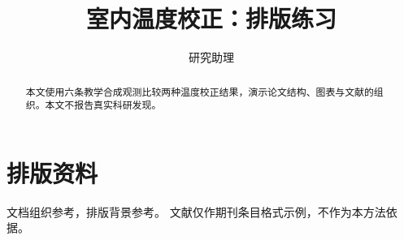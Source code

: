 \documentclass[UTF8,fontset=fandol,a4paper,11pt]{ctexart}
\title{室内温度校正：排版练习}
\author{研究助理}
\date{}
\begin{document}
\maketitle
\begin{abstract}本文使用六条教学合成观测比较两种温度校正结果，演示论文结构、图表与文献的组织。本文不报告真实科研发现。\end{abstract}



\section{排版资料}
文档组织参考\cite{lamport1994}，排版背景参考\cite{knuth1984}。
文献\cite{einstein1905}仅作期刊条目格式示例，不作为本方法依据。
\printbibliography[title={参考文献}]
\end{document}
